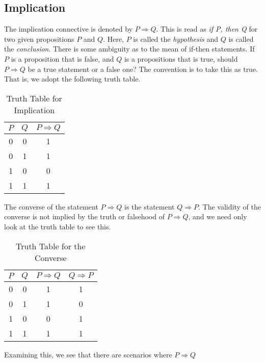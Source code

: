     \subsection{Implication}
        The implication connective is denoted by $P\Rightarrow{Q}$. This is read
        as \textit{if P, then Q} for two given propositions $P$ and $Q$. Here,
        $P$ is called the \textit{hypothesis} and $Q$ is called the
        \textit{conclusion}. There is some ambiguity as to the mean of if-then
        statements. If $P$ is a proposition that is false, and $Q$ is a
        propositions that is true, should $P\Rightarrow{Q}$ be a true statement
        or a false one? The convention is to take this as true. That is, we
        adopt the following truth table.
        \begin{table}[H]
            \centering
            \captionsetup{type=table}
            \begin{tabular}{ccc}
                $P$&$Q$&$P\Rightarrow{Q}$\\
                \hline
                0&0&1\\
                0&1&1\\
                1&0&0\\
                1&1&1
            \end{tabular}
            \caption{Truth Table for Implication}
            \label{tab:Truth_Table_for_Implication}
        \end{table}
        The converse of the statement $P\Rightarrow{Q}$ is the statement
        $Q\Rightarrow{P}$. The validity of the converse is not implied by the
        truth or falsehood of $P\Rightarrow{Q}$, and we need only look at the
        truth table to see this.
        \begin{table}[H]
            \centering
            \captionsetup{type=table}
            \begin{tabular}{cccc}
                $P$&$Q$&$P\Rightarrow{Q}$&$Q\Rightarrow{P}$\\
                \hline
                0&0&1&1\\
                0&1&1&0\\
                1&0&0&1\\
                1&1&1&1
            \end{tabular}
            \caption{Truth Table for the Converse}
            \label{tab:Truth_Table_for_Converse}
        \end{table}
        Examining this, we see that there are scenarios where $P\Rightarrow{Q}$
